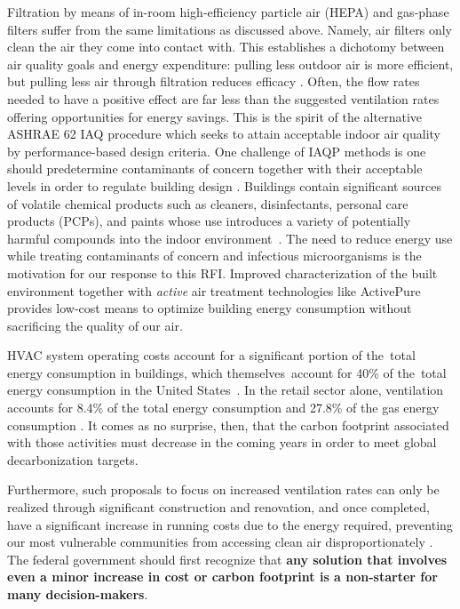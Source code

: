 Filtration by means of in-room high-efficiency particle air (HEPA) and gas-phase filters suffer from the same limitations as discussed above. Namely, air filters only clean the air they come into contact with. This establishes a dichotomy between air quality goals and energy expenditure: pulling less outdoor air is more efficient, but pulling less air through filtration reduces efficacy \cite{lamping_air_nodate}. Often, the flow rates needed to have a positive effect are far less than the suggested ventilation rates offering opportunities for energy savings. This is the spirit of the alternative ASHRAE 62 IAQ procedure which seeks to attain acceptable indoor air quality by performance-based design criteria. One challenge of IAQP methods is one should predetermine contaminants of concern together with their acceptable levels in order to regulate building design \cite{zaatari_impact_2016}. Buildings contain significant sources of volatile chemical products such as cleaners, disinfectants, personal care products (PCPs), and paints whose use introduces a variety of potentially harmful compounds into the indoor \hbox{environment \cite{finewax_quantification_2021}}. The need to reduce energy use while treating  contaminants of concern and infectious microorganisms is the motivation for our response to this RFI. Improved characterization of the built environment together with \textit{active} air treatment technologies like ActivePure provides low-cost means to optimize building energy consumption without sacrificing the quality of our air.


HVAC system operating costs account for a significant portion of the total energy consumption in buildings, which themselves account for 40\% of the total energy consumption in the United \hbox{States \cite{ng_IAQ_2015}}. In the retail sector alone, ventilation accounts for 8.4\% of the total energy consumption and 27.8\% of the gas energy consumption \cite{zaatari_impact_2016}. It comes as no surprise, then, that the carbon footprint associated with those activities must decrease in the coming years in order to meet global decarbonization targets. 


Furthermore, such proposals to focus on increased ventilation rates can only be realized through significant construction and renovation, and once completed, have a significant increase in running costs due to the energy required, preventing our most vulnerable communities from accessing clean air disproportionately \cite{lamping_air_nodate}. The federal government should first recognize that \textbf{any solution that involves even a minor increase in cost or carbon footprint is a non-starter for many decision-makers}.

